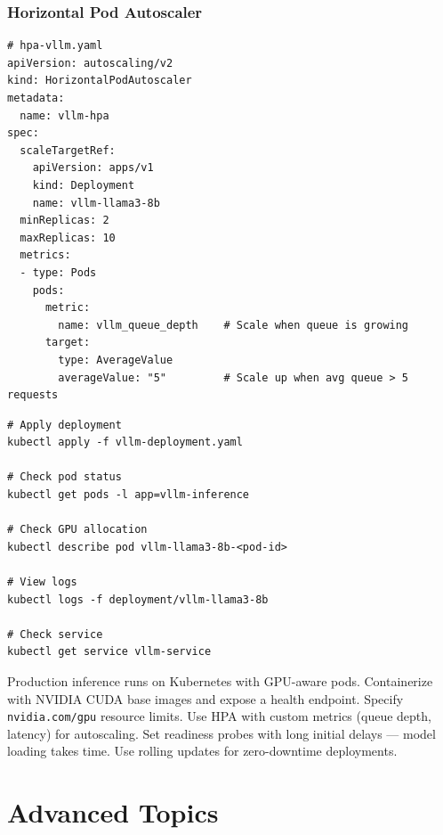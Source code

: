 \documentclass[10pt, oneside, openany]{book}
\newenvironment{chapsummary}
  {\begin{tcolorbox}[enhanced, breakable,
    colback={rgb,255:red,245;green,245;blue,225},
    colframe=AccentOrange, boxrule=1.5pt, arc=4pt,
    title={\bfseries Chapter Summary},
    fonttitle=\bfseries\color{white},
    attach boxed title to top left={yshift=-2mm, xshift=5mm},
    boxed title style={colback=AccentOrange, arc=2pt}]}
  {\end{tcolorbox}}
\begin{document}
\section{Horizontal Pod Autoscaler}

\begin{lstlisting}[style=yamlstyle, caption={HPA based on custom latency metric}]
# hpa-vllm.yaml
apiVersion: autoscaling/v2
kind: HorizontalPodAutoscaler
metadata:
  name: vllm-hpa
spec:
  scaleTargetRef:
    apiVersion: apps/v1
    kind: Deployment
    name: vllm-llama3-8b
  minReplicas: 2
  maxReplicas: 10
  metrics:
  - type: Pods
    pods:
      metric:
        name: vllm_queue_depth    # Scale when queue is growing
      target:
        type: AverageValue
        averageValue: "5"         # Scale up when avg queue > 5 requests
\end{lstlisting}

\begin{lstlisting}[style=bashstyle, caption={Deploying to Kubernetes}]
# Apply deployment
kubectl apply -f vllm-deployment.yaml

# Check pod status
kubectl get pods -l app=vllm-inference

# Check GPU allocation
kubectl describe pod vllm-llama3-8b-<pod-id>

# View logs
kubectl logs -f deployment/vllm-llama3-8b

# Check service
kubectl get service vllm-service
\end{lstlisting}

\begin{chapsummary}
Production inference runs on Kubernetes with GPU-aware pods.  Containerize with
NVIDIA CUDA base images and expose a health endpoint.  Specify
\texttt{nvidia.com/gpu} resource limits.  Use HPA with custom metrics (queue
depth, latency) for autoscaling.  Set readiness probes with long initial delays
--- model loading takes time.  Use rolling updates for zero-downtime deployments.
\end{chapsummary}

\part{Advanced Topics}

\end{document}

